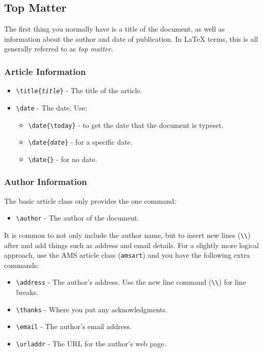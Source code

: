 \documentclass{article}
\begin{document}
\subsection{Top Matter}
The first thing you normally have is a title of the document, as well as
information about the author and date of publication.  In \LaTeX{} terms,
this is all generally referred to as \emph{top matter}.

\subsubsection{Article Information}
\begin{itemize}
	\item \texttt{\textbackslash title\{\emph{title}\}} - The title of the article.
	\item \texttt{\textbackslash date} - The date. Use:
		\begin{itemize}
			\item \texttt{\textbackslash date\{\textbackslash today\}} - to get the
			date that the document is typeset.
			\item \texttt{\textbackslash date\{\emph{date}\}} - for a  %
			specific date.
			\item \texttt{\textbackslash date\{\}} - for no date.
		\end{itemize}
\end{itemize}

\subsubsection{Author Information}
The basic article class only provides the one command:
\begin{itemize}
	\item \texttt{\textbackslash author} - The author of the document.
\end{itemize}

It is common to not only include the author name, but to insert new
lines (\texttt{\textbackslash\textbackslash}) after and add things such
as address and email details.  For a slightly more logical approach, use
the AMS article class (\texttt{amsart}) and you have the following extra
commands:
\begin{itemize}
	\item \texttt{\textbackslash address} - The author's address.  Use
	the new line command (\texttt{\textbackslash\textbackslash}) for
	line breaks.
	\item \texttt{\textbackslash thanks} - Where you put any acknowledgments.
	\item \texttt{\textbackslash email} - The author's email address.
	\item \texttt{\textbackslash urladdr} - The URL for the author's web page.
\end{itemize}
\end{document}
